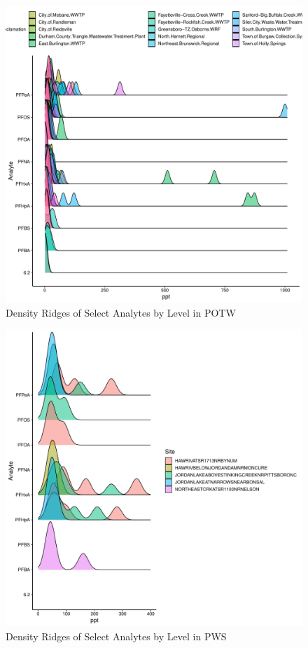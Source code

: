 \documentclass[
  12pt,
]{article}
\begin{document}
\begin{figure}

\includegraphics{PFAS_FinalProject_files/figure-latex/unnamed-chunk-6-1} \hfill{}

\caption{Density Ridges of Select Analytes by Level in POTW}\label{fig:unnamed-chunk-6}
\end{figure}

\begin{figure}

\includegraphics{PFAS_FinalProject_files/figure-latex/unnamed-chunk-7-1} \hfill{}

\caption{Density Ridges of Select Analytes by Level in PWS}\label{fig:unnamed-chunk-7}
\end{figure}
\end{document}
